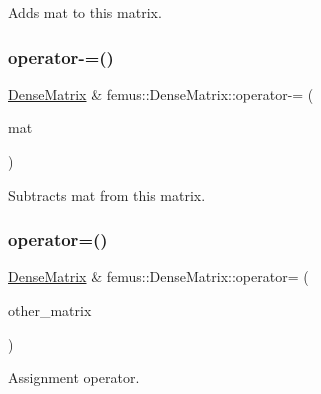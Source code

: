 Adds {\ttfamily mat} to this matrix. 

\mbox{\label{classfemus_1_1_dense_matrix_a9e44e590645899830566d1dcb29b778f}} 
\subsubsection{\texorpdfstring{operator-\/=()}{operator-=()}}
{\footnotesize\ttfamily \mbox{\hyperlink{classfemus_1_1_dense_matrix}{Dense\+Matrix}} \& femus\+::\+Dense\+Matrix\+::operator-\/= (\begin{DoxyParamCaption}\item[{const \mbox{\hyperlink{classfemus_1_1_dense_matrix}{Dense\+Matrix}} \&}]{mat }\end{DoxyParamCaption})\hspace{0.3cm}{\ttfamily [inline]}}



Subtracts {\ttfamily mat} from this matrix. 

\mbox{\label{classfemus_1_1_dense_matrix_a44a381eba83cf091b48a270854860c10}} 
\subsubsection{\texorpdfstring{operator=()}{operator=()}}
{\footnotesize\ttfamily \mbox{\hyperlink{classfemus_1_1_dense_matrix}{Dense\+Matrix}} \& femus\+::\+Dense\+Matrix\+::operator= (\begin{DoxyParamCaption}\item[{const \mbox{\hyperlink{classfemus_1_1_dense_matrix}{Dense\+Matrix}} \&}]{other\+\_\+matrix }\end{DoxyParamCaption})\hspace{0.3cm}{\ttfamily [inline]}}



Assignment operator. 

\mbox{\label{classfemus_1_1_dense_matrix_a7d005d3213672a2e7e34fe7c4203881e}} 
